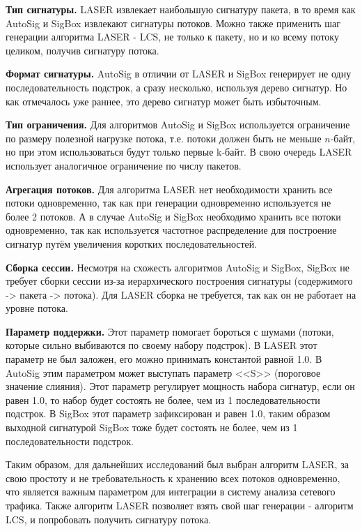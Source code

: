 \textbf{Тип сигнатуры.} LASER извлекает наибольшую сигнатуру пакета, в то время как AutoSig и SigBox извлекают сигнатуры потоков.
Можно также применить шаг генерации алгоритма LASER - LCS, не только к пакету, но и ко всему потоку целиком, получив сигнатуру потока.

\textbf{Формат сигнатуры.} AutoSig в отличии от LASER и SigBox генерирует не одну последовательность подстрок,
а сразу несколько, используя дерево сигнатур.
Но как отмечалось уже раннее, это дерево сигнатур может быть избыточным.

\textbf{Тип ограничения.} Для алгоритмов AutoSig и SigBox используется ограничение по размеру полезной нагрузке потока,
т.е. потоки должен быть не меньше $n$-байт, но при этом использоваться будут только первые k-байт.
В свою очередь LASER использует аналогичное ограничение по числу пакетов.

\textbf{Агрегация потоков.} Для алгоритма LASER нет необходимости хранить все потоки одновременно,
так как при генерации одновременно используется не более 2 потоков.
А в случае AutoSig и SigBox необходимо хранить все потоки одновременно,
так как используется частотное распределение для построение сигнатур путём увеличения коротких последовательностей.

\textbf{Сборка сессии.} Несмотря на схожесть алгоритмов AutoSig и SigBox,
SigBox не требует сборки сессии из-за иерархического построения сигнатуры (содержимого -> пакета -> потока).
Для LASER сборка не требуется, так как он не работает на уровне потока.

\textbf{Параметр поддержки.} Этот параметр помогает бороться с шумами (потоки, которые сильно выбиваются по своему набору подстрок).
В LASER этот параметр не был заложен, его можно принимать константой равной 1.0. В AutoSig этим параметром может выступать параметр <<S>> (пороговое значение слияния).
Этот параметр регулирует мощность набора сигнатур, если он равен 1.0, то набор будет состоять не более, чем из 1 последовательности подстрок.
В SigBox этот параметр зафиксирован и равен 1.0, таким образом
выходной сигнатурой SigBox тоже будет состоять не более, чем из 1 последовательности подстрок.

Таким образом, для дальнейших исследований был выбран алгоритм LASER, за свою простоту и не требовательность
к хранению всех потоков одновременно, что является важным параметром для интеграции в систему анализа сетевого трафика.
Также алгоритм LASER позволяет взять свой шаг генерации - алгоритм LCS, и попробовать получить сигнатуру потока.

